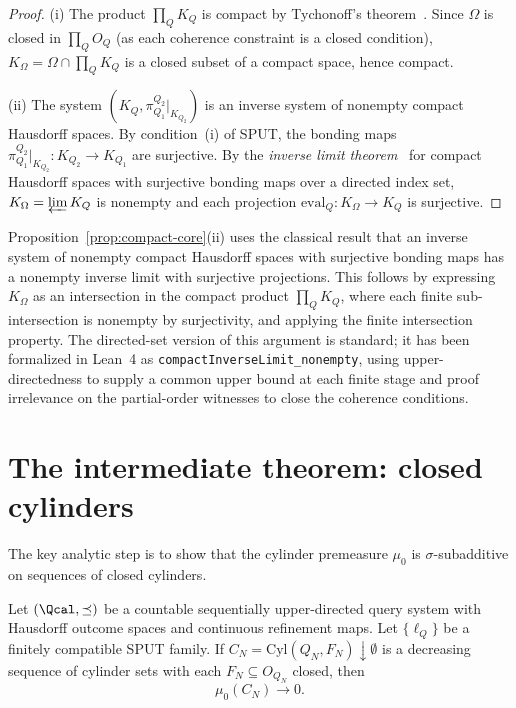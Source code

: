 \begin{proof}
(i) The product $\prod_Q K_Q$ is compact by Tychonoff's theorem~\cite{Bourbaki1966}.
Since $\Omega$ is closed in $\prod_Q O_Q$ (as each coherence
constraint is a closed condition), $K_\Omega = \Omega \cap \prod_Q
K_Q$ is a closed subset of a compact space, hence compact.

(ii) The system $(K_Q, \pi^{Q_2}_{Q_1}|_{K_{Q_2}})$ is an inverse
system of nonempty compact Hausdorff spaces.  By condition~(i) of
SPUT, the bonding maps $\pi^{Q_2}_{Q_1}|_{K_{Q_2}} : K_{Q_2} \to
K_{Q_1}$ are surjective.  By the \emph{inverse limit theorem}~\cite{Bourbaki1966,Fremlin2003} for
compact Hausdorff spaces with surjective bonding maps over a directed
index set, $K_\Omega = \varprojlim K_Q$ is nonempty and each
projection $\mathrm{eval}_Q : K_\Omega \to K_Q$ is surjective.
\end{proof}

\begin{remark}
Proposition~\ref{prop:compact-core}(ii) uses the classical result
that an inverse system of nonempty compact Hausdorff spaces with
surjective bonding maps has a nonempty inverse limit with surjective
projections.  This follows by expressing $K_\Omega$ as an
intersection in the compact product $\prod_Q K_Q$, where each finite
sub-intersection is nonempty by surjectivity, and applying the
finite intersection property.  The directed-set version of this
argument is standard; it has been formalized in Lean~4 as
\texttt{compactInverseLimit\_nonempty}, using upper-directedness to
supply a common upper bound at each finite stage and proof irrelevance
on the partial-order witnesses to close the coherence conditions.
\end{remark}

\section[Closed cylinders]{The intermediate theorem: closed cylinders}\label{sec:closed}

The key analytic step is to show that the cylinder premeasure
$\mu_0$ is $\sigma$-subadditive on sequences of closed cylinders.

\begin{theorem}
\label{thm:closed-cylinders}
Let $(\Qcal, \preceq)$ be a countable sequentially upper-directed
query system with Hausdorff outcome spaces and continuous refinement
maps.  Let $\{\ell_Q\}$ be a finitely compatible SPUT family.  If
$C_N = \mathrm{Cyl}(Q_N, F_N) \downarrow \emptyset$ is a decreasing
sequence of cylinder sets with each $F_N \subseteq O_{Q_N}$ closed,
then
\[
\mu_0(C_N) \to 0.
\]
\end{theorem}


